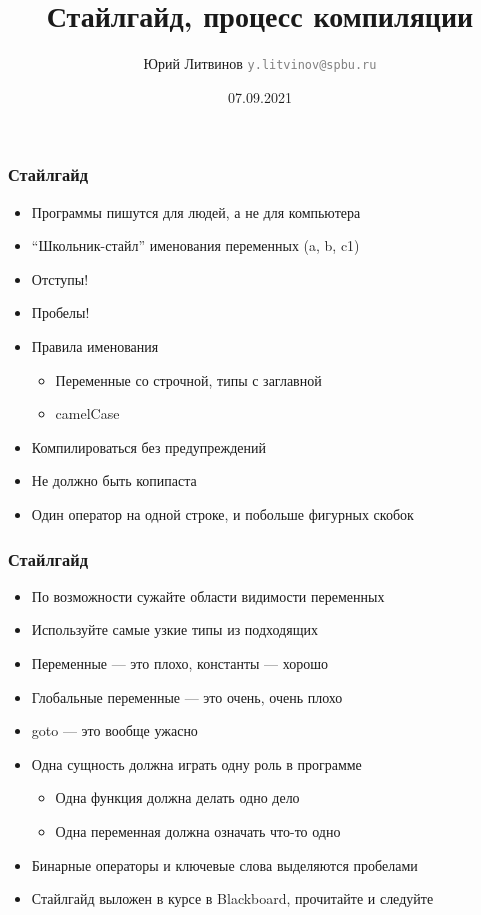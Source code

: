 \documentclass[xetex,mathserif,serif]{beamer}
\title{Стайлгайд, процесс компиляции}
\author[Юрий Литвинов]{Юрий Литвинов \newline \textcolor{gray}{\small\texttt{y.litvinov@spbu.ru}}}
\date{07.09.2021}
\begin{document}
    
    \frame{\titlepage}
    
    \begin{frame}
        \frametitle{Стайлгайд}
        \begin{itemize}
            \item Программы пишутся для людей, а не для компьютера
            \item ``Школьник-стайл'' именования переменных (a, b, c1)
            \item Отступы!
            \item Пробелы!
            \item Правила именования
            \begin{itemize}
                \item Переменные со строчной, типы с заглавной
                \item camelCase
            \end{itemize}
            \item Компилироваться без предупреждений
            \item Не должно быть копипаста
            \item Один оператор на одной строке, и побольше фигурных скобок
        \end{itemize}
    \end{frame}

    \begin{frame}
        \frametitle{Стайлгайд}
        \begin{itemize}
            \item По возможности сужайте области видимости переменных
            \item Используйте самые узкие типы из подходящих
            \item Переменные --- это плохо, константы --- хорошо
            \item Глобальные переменные --- это очень, очень плохо
            \item goto --- это вообще ужасно
            \item Одна сущность должна играть одну роль в программе
            \begin{itemize}
                \item Одна функция должна делать одно дело
                \item Одна переменная должна означать что-то одно
            \end{itemize}
            \item Бинарные операторы и ключевые слова выделяются пробелами
            \item Стайлгайд выложен в курсе в Blackboard, прочитайте и следуйте
        \end{itemize}
    \end{frame}
\end{document}
